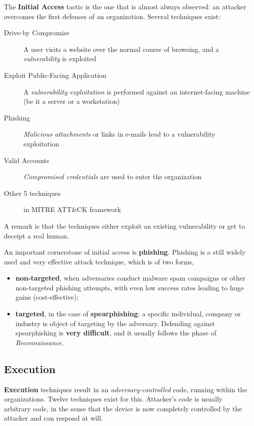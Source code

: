 \documentclass[10pt]{extreport}
\begin{document}
The \textbf{Initial Access} tactic is the one that is almost always observed:
an attacker overcomes the first defenses of an organization. Several techniques
exist:
\begin{description}
    \item[Drive\--by Compromise] A user visits a website over the normal course
        of browsing, and a \emph{vulnerability} is exploited
    \item[Exploit Public\--Facing Application] A \emph{vulnerability
        exploitation} is performed against an internet\--facing machine (be it
        a server or a workstation)
    \item[Phishing] \emph{Malicious attachments} or links in e\--mails lead to a
        vulnerability exploitation
    \item[Valid Accounts] \emph{Compromised credentials} are used to enter the organization
    \item[Other 5 techniques] in MITRE ATT\&CK framework
\end{description}

A remark is that the techniques either exploit an existing vulnerability or get
to deceipt a real human.

An important cornerstone of initial access is \textbf{phishing}. Phishing is a still widely used and very effective attack technique, which is of two forms,
\begin{itemize}
    \item \textbf{non\--targeted}, when adversaries conduct malware spam
        campaigns or other non\--targeted phishing attempts, with even low
        success rates leading to huge gains (cost\--effective);
    \item \textbf{targeted}, in the case of \textbf{spearphishing}: a specific
        individual, company or industry is object of targeting by the
        adversary. Defending against spearphishing is \textbf{very difficult},
        and it usually follows the phase of \emph{Reconnaissance}.
\end{itemize}


\subsection{Execution}

\textbf{Execution} techniques result in an \emph{adversary\--controlled} code,
running within the organizations. Twelve techniques exist for this. Attacker's
code is usually arbitrary code, in the sense that the device is now completely
controlled by the attacker and can respond at will.
\end{document}
